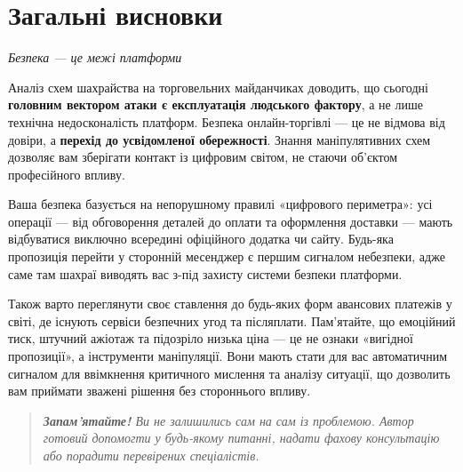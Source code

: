 ﻿\chapter*{Загальні висновки}

\vspace{-0.5em} %

\begin{center}
    \textit{Безпека — це межі платформи}
\end{center}

\vspace{0.01cm}

Аналіз схем шахрайства на торговельних майданчиках доводить, що сьогодні  \textbf{головним вектором атаки є експлуатація людського фактору}, а не лише технічна недосконалість платформ. Безпека онлайн-торгівлі — це не відмова від довіри, а \textbf{перехід до усвідомленої обережності}. Знання маніпулятивних схем дозволяє вам зберігати контакт із цифровим світом, не стаючи об'єктом професійного впливу.

Ваша безпека базується на непорушному правилі «цифрового периметра»: усі операції — від обговорення деталей до оплати та оформлення доставки — мають відбуватися виключно всередині офіційного додатка чи сайту. Будь-яка пропозиція перейти у сторонній месенджер є першим сигналом небезпеки, адже саме там шахраї виводять вас з-під захисту системи безпеки платформи.

Також варто переглянути своє ставлення до будь-яких форм авансових платежів у світі, де існують сервіси безпечних угод та післяплати. Пам’ятайте, що емоційний тиск, штучний ажіотаж та підозріло низька ціна — це не ознаки «вигідної пропозиції», а інструменти маніпуляції. Вони мають стати для вас автоматичним сигналом для ввімкнення критичного мислення та аналізу ситуації, що дозволить вам приймати зважені рішення без стороннього впливу.


\begin{quote}
    \itshape
    \textbf{Запам'ятайте!} Ви не залишились сам на сам із проблемою. Автор готовий допомогти у будь-якому питанні, надати фахову консультацію або порадити перевірених спеціалістів.
\end{quote}

